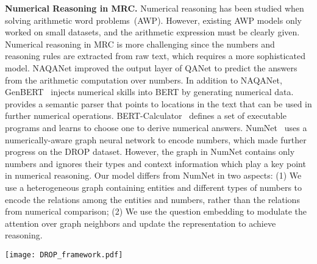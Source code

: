 \documentclass{article}
\begin{document}
{\bf Numerical Reasoning in MRC.}
Numerical reasoning has been studied when solving arithmetic word problems~(AWP). However, existing AWP models only worked on small datasets, and the arithmetic expression must be clearly given. Numerical reasoning in MRC is more challenging since the numbers and reasoning rules are extracted from raw text, which requires a more sophisticated model.
NAQANet improved the output layer of QANet to predict the answers from the arithmetic computation over numbers. 
In addition to NAQANet, GenBERT~\cite{ggb2020injecting} injects numerical skills into BERT by generating numerical data.
~\cite{DBLP:conf/iclr/ChenLYZSL20} provides a semantic parser that points to locations in the text that can be used in further numerical operations.
BERT-Calculator~\cite{DBLP:conf/emnlp/AndorHLP19} defines a set of executable programs and learns to choose one to derive numerical answers. 
NumNet~\cite{DBLP:conf/emnlp/RanLLZL19} uses a numerically-aware graph neural network to encode numbers, which made further progress on the DROP dataset.
However, the graph in NumNet contains only numbers and ignores their types and context information which play a key point in numerical reasoning. 
Our model differs from NumNet in two aspects: (1) We use a heterogeneous graph containing entities and different types of numbers to encode the relations among the entities and numbers, rather than the relations from numerical comparison; (2) We use the question embedding to modulate the attention over graph neighbors and update the representation to achieve reasoning.

\begin{figure*}
\centering
\texttt{[image: DROP\_framework.pdf]}
\vspace{-4mm}
\caption{
The framework of our model. It consists of a representation extractor (left), a reasoning module (middle) and a prediction module (right).
The reasoning module reasons over a heterogeneous directed graph whose nodes are the numbers and the entities.
Two kinds of relations are encoded: (1) the numbers of the same type are connected with each other by the type-specific edges, (2) the entities and the numbers are connected when they co-occur in a sentence.
The reasoning is conditioned on the question explicitly to guide the message propagation over the graph.
In each iteration, each node selectively receives the messages from the neighboring nodes with the question representation to update its representation.
The derived representations of these nodes are then combined with the RoBERTa output for the final prediction module.
The dashed circle means zero vector.
} 
\label{fig:framework}
\end{figure*}
\end{document}
